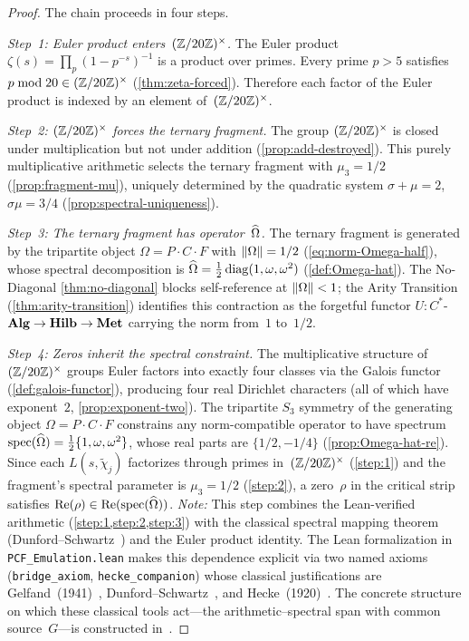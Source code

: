 \begin{proof}
The chain proceeds in four steps.

\emph{Step~1: Euler product enters~$(\mathbb{Z}/20\mathbb{Z})^\times$.}\label{step:1}
The Euler product $\zeta(s)=\prod_p(1-p^{-s})^{-1}$ is a product over
primes.  Every prime $p>5$ satisfies $p\bmod 20\in(\mathbb{Z}/20\mathbb{Z})^\times$
(\cref{thm:zeta-forced}).  Therefore each factor of the Euler
product is indexed by an element of~$(\mathbb{Z}/20\mathbb{Z})^\times$.

\emph{Step~2: $(\mathbb{Z}/20\mathbb{Z})^\times$ forces the ternary fragment.}\label{step:2}
The group $(\mathbb{Z}/20\mathbb{Z})^\times$ is closed under multiplication but not under
addition (\cref{prop:add-destroyed}).  This purely
multiplicative arithmetic selects the ternary fragment with
$\mu_3=1/2$ (\cref{prop:fragment-mu}), uniquely determined
by the quadratic system $\sigma+\mu=2$, $\sigma\mu=3/4$
(\cref{prop:spectral-uniqueness}).

\emph{Step~3: The ternary fragment has operator~$\widehat{\Omega}$.}\label{step:3}
The ternary fragment is generated by the tripartite object
$\Omega = P\cdot C\cdot F$ with $\|\Omega\|=1/2$
(\cref{eq:norm-Omega-half}), whose spectral decomposition is
$\widehat{\Omega} = \tfrac{1}{2}\,\mathrm{diag}(1,\omega,\omega^2)$
(\cref{def:Omega-hat}).  The No-Diagonal
\cref{thm:no-diagonal} blocks self-reference at
$\|\Omega\|<1$; the Arity Transition
(\cref{thm:arity-transition}) identifies this contraction as
the forgetful functor $U\colon C^*$-$\mathbf{Alg}\to\mathbf{Hilb}\to\mathbf{Met}$
carrying the norm from~$1$ to~$1/2$.

\emph{Step~4: Zeros inherit the spectral constraint.}\label{step:4}
The multiplicative structure of~$(\mathbb{Z}/20\mathbb{Z})^\times$ groups Euler factors into
exactly four classes via the Galois functor (\cref{def:galois-functor}),
producing four real Dirichlet characters (all of which have
exponent~$2$, \cref{prop:exponent-two}).
The tripartite $S_3$
symmetry of the generating object $\Omega = P\cdot C\cdot F$ constrains
any norm-compatible operator to have spectrum
$\mathrm{spec}(\widehat{\Omega}) = \tfrac{1}{2}\{1,\omega,\omega^2\}$, whose real
parts are $\{1/2, -1/4\}$ (\cref{prop:Omega-hat-re}).
Since each $L(s,\tilde\chi_j)$ factorizes through primes in~$(\mathbb{Z}/20\mathbb{Z})^\times$
(\cref{step:1}) and the fragment's spectral parameter is $\mu_3 = 1/2$ (\cref{step:2}),
a zero~$\rho$ in the critical strip satisfies
$\mathrm{Re}(\rho) \in \mathrm{Re}(\mathrm{spec}(\widehat{\Omega}))$.
\emph{Note:} This step combines the Lean-verified arithmetic
(\cref{step:1,step:2,step:3}) with the classical spectral mapping
theorem
(Dunford--Schwartz~\cite{dunford58}) and the Euler product identity.
The Lean formalization in \texttt{PCF\_Emulation.lean} makes this
dependence explicit via two named axioms (\texttt{bridge\_axiom},
\texttt{hecke\_companion}) whose classical justifications are
Gelfand~(1941)~\cite{gelfand41}, Dunford--Schwartz~\cite{dunford58},
and Hecke~(1920)~\cite{hecke20}.
The concrete structure on which these classical tools act---the
arithmetic--spectral span with common source~$G$---is constructed
in~\cite{gonzalez26}.
\end{proof}


